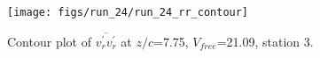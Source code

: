 \begin{figure}[H]
\centering
\texttt{[image: figs/run\_24/run\_24\_rr\_contour]}
\caption{Contour plot of $\overline{v_{r}^{\prime} v_{r}^{\prime}}$ at $z/c$=7.75, $V_{free}$=21.09, station 3.}
\label{fig:run_24_rr_contour}
\end{figure}


